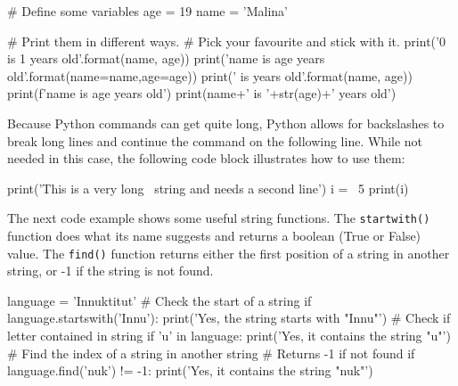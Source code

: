 \begin{samepage}
\begin{pythoncode}
# Define some variables
age = 19
name = 'Malina'

# Print them in different ways. 
# Pick your favourite and stick with it.
print('{0} is {1} years old'.format(name, age))
print('{name} is {age} years old'.format(name=name,age=age))
print('{} is {} years old'.format(name, age))
print(f'{name} is {age} years old')
print(name+' is '+str(age)+' years old')
\end{pythoncode}
\end{samepage}

\noindent Because Python commands can get quite long, Python allows for backslashes to break long lines and continue the command on the following line. While not needed in this case, the following code block illustrates how to use them:

\begin{samepage}
\begin{pythoncode}
print('This is a very long \
string and needs a second line')
i = \
5
print(i)
\end{pythoncode}
\end{samepage}



\noindent The next code example shows some useful string functions. The \texttt{startwith()} function does what its name suggests and returns a boolean (True or False) value. The \texttt{find()} function returns either the first position of a string in another string, or -1 if the string is not found. 

\begin{samepage}
\begin{pythoncode}
language = 'Innuktitut'
# Check the start of a string
if language.startswith('Innu'):
    print('Yes, the string starts with "Innu"')
# Check if letter contained in string
if 'u' in language:
    print('Yes, it contains the string "u"')
# Find the index of a string in another string
# Returns -1 if not found
if language.find('nuk') != -1:
    print('Yes, it contains the string "nuk"')
\end{pythoncode}
\end{samepage}

